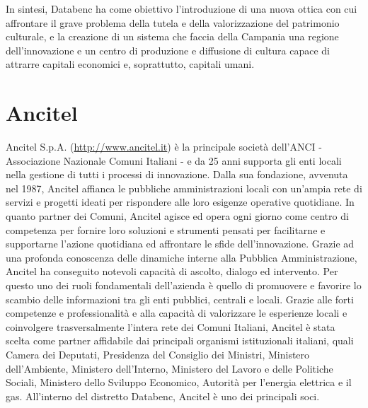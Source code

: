 In sintesi, Databenc ha come obiettivo l'introduzione di una nuova ottica con cui affrontare il grave problema della tutela e della valorizzazione del patrimonio culturale, e la creazione di un sistema che faccia della Campania una regione dell'innovazione e un centro di produzione e diffusione di cultura capace di attrarre capitali economici e, soprattutto, capitali umani.


\section{Ancitel}

Ancitel S.p.A. (\url{http://www.ancitel.it}) è la principale società dell'ANCI - Associazione Nazionale Comuni Italiani - e da 25 anni supporta gli enti locali nella gestione di tutti i processi di innovazione.
Dalla sua fondazione, avvenuta nel 1987,  Ancitel affianca le pubbliche amministrazioni locali con un'ampia rete di servizi e progetti ideati per rispondere alle loro esigenze operative quotidiane.
In quanto partner dei Comuni, Ancitel agisce ed opera ogni giorno come centro di competenza per fornire loro soluzioni e strumenti pensati per facilitarne e supportarne l'azione quotidiana ed affrontare le sfide dell'innovazione. 
Grazie ad una profonda conoscenza delle dinamiche interne alla Pubblica Amministrazione, Ancitel ha conseguito notevoli capacità di ascolto, dialogo ed intervento. Per questo uno dei ruoli fondamentali dell'azienda è quello di promuovere e favorire lo scambio delle informazioni tra gli enti pubblici, centrali e locali.
Grazie alle forti competenze e professionalità e alla capacità di valorizzare le esperienze locali e coinvolgere trasversalmente l'intera rete dei Comuni Italiani, Ancitel è stata scelta come partner affidabile dai principali organismi istituzionali italiani, quali Camera dei Deputati, Presidenza del Consiglio dei Ministri, Ministero dell'Ambiente, Ministero dell'Interno, Ministero del Lavoro e delle Politiche Sociali, Ministero dello Sviluppo Economico, Autorità per l'energia elettrica e il gas.
All'interno del distretto Databenc, Ancitel è uno dei principali soci. 


